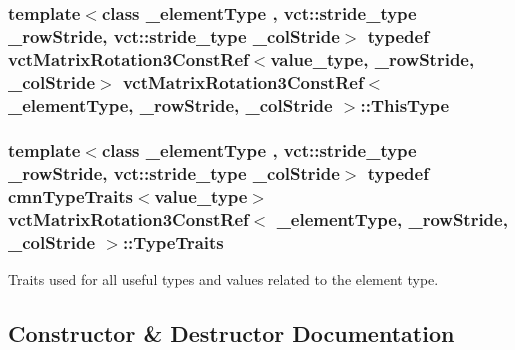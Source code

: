 \subsubsection[{This\+Type}]{\setlength{\rightskip}{0pt plus 5cm}template$<$class \+\_\+element\+Type , vct\+::stride\+\_\+type \+\_\+row\+Stride, vct\+::stride\+\_\+type \+\_\+col\+Stride$>$ typedef {\bf vct\+Matrix\+Rotation3\+Const\+Ref}$<$value\+\_\+type, \+\_\+row\+Stride, \+\_\+col\+Stride$>$ {\bf vct\+Matrix\+Rotation3\+Const\+Ref}$<$ \+\_\+element\+Type, \+\_\+row\+Stride, \+\_\+col\+Stride $>$\+::{\bf This\+Type}}\label{classvct_matrix_rotation3_const_ref_a92075d31084a3f4bb466e724a8719693}
\hypertarget{classvct_matrix_rotation3_const_ref_aa8c0563184a7d080a880ca6b066b2440}{}
\subsubsection[{Type\+Traits}]{\setlength{\rightskip}{0pt plus 5cm}template$<$class \+\_\+element\+Type , vct\+::stride\+\_\+type \+\_\+row\+Stride, vct\+::stride\+\_\+type \+\_\+col\+Stride$>$ typedef {\bf cmn\+Type\+Traits}$<$value\+\_\+type$>$ {\bf vct\+Matrix\+Rotation3\+Const\+Ref}$<$ \+\_\+element\+Type, \+\_\+row\+Stride, \+\_\+col\+Stride $>$\+::{\bf Type\+Traits}}\label{classvct_matrix_rotation3_const_ref_aa8c0563184a7d080a880ca6b066b2440}
Traits used for all useful types and values related to the element type. 

\subsection{Constructor \& Destructor Documentation}
\hypertarget{classvct_matrix_rotation3_const_ref_a9c17ae86f86673a157ce4c1b22582c2f}{}
